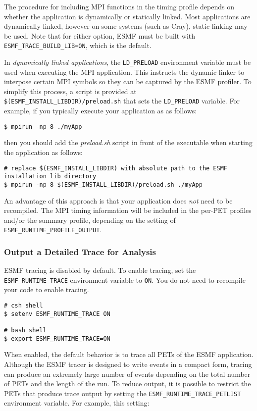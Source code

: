 The procedure for including MPI
functions in the timing profile depends on whether the application is
dynamically or statically linked. Most applications are dynamically linked,
however on some systems (such as Cray), static linking may be used.
Note that for either option, ESMF must be built with {\tt ESMF\_TRACE\_BUILD\_LIB=ON},
which is the default.


In {\em dynamically linked applications}, the {\tt LD\_PRELOAD} environment variable
must be used when executing the MPI application.  This instructs the dynamic
linker to interpose certain MPI symbols so they can be captured by the ESMF
profiler.  To simplify this process, a script is provided at
{\tt \$(ESMF\_INSTALL\_LIBDIR)/preload.sh} that sets the {\tt LD\_PRELOAD} variable.
For example, if you typically execute your application as as follows:

\begin{verbatim}
$ mpirun -np 8 ./myApp
\end{verbatim}

then you should add the {\em preload.sh} script in front of the
executable when starting the application as follows:

\begin{verbatim}
# replace $(ESMF_INSTALL_LIBDIR) with absolute path to the ESMF installation lib directory
$ mpirun -np 8 $(ESMF_INSTALL_LIBDIR)/preload.sh ./myApp
\end{verbatim}

An advantage of this approach is that your application does {\em not} need to
be recompiled. The MPI timing information will be included in the per-PET profiles and/or the summary
profile, depending on the setting of {\tt ESMF\_RUNTIME\_PROFILE\_OUTPUT}.


\subsubsection{Output a Detailed Trace for Analysis}


ESMF tracing is disabled by default. To enable tracing, set the
{\tt ESMF\_RUNTIME\_TRACE} environment variable to {\tt ON}. You
do not need to recompile your code to enable tracing.

\begin{verbatim}
# csh shell
$ setenv ESMF_RUNTIME_TRACE ON

# bash shell
$ export ESMF_RUNTIME_TRACE=ON
\end{verbatim}

When enabled, the default behavior is to trace all PETs of the
ESMF application. Although the ESMF tracer is designed to write
events in a compact form, tracing can produce an extremely
large number of events depending on the total number of PETs and
the length of the run. To reduce output, it is possible to restrict
the PETs that produce trace output by setting the {\tt ESMF\_RUNTIME\_TRACE\_PETLIST}
environment variable. For example, this setting:

